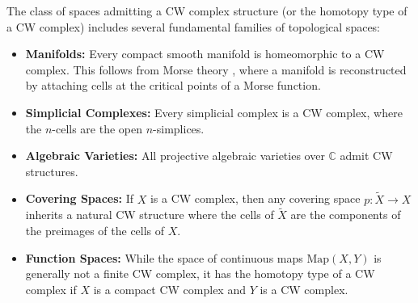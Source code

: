 \begin{proposition} \label{proposition:nice_classes_of_spaces_that_are_CW_complexes}
The class of spaces admitting a CW complex structure (or the homotopy type of a CW complex) includes several fundamental families of topological spaces:
\begin{itemize}
    \item \textbf{Manifolds:} Every compact smooth manifold is homeomorphic to a CW complex. This follows from Morse theory , where a manifold is reconstructed by attaching cells at the critical points of a Morse function.
    \item \textbf{Simplicial Complexes:} Every simplicial complex is a CW complex, where the $n$-cells are the open $n$-simplices.
    \item \textbf{Algebraic Varieties:} All projective algebraic varieties over $\mathbb{C}$ admit CW structures.
    \item \textbf{Covering Spaces:} If $X$ is a CW complex, then any covering space $p: \tilde{X} \to X$ inherits a natural CW structure where the cells of $\tilde{X}$ are the components of the preimages of the cells of $X$.
    \item \textbf{Function Spaces:} While the space of continuous maps $\text{Map}(X, Y)$ is generally not a finite CW complex, it has the homotopy type of a CW complex if $X$ is a compact CW complex and $Y$ is a CW complex.
\end{itemize}
\end{proposition}